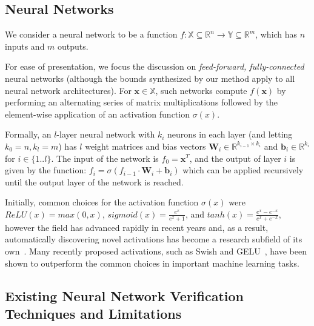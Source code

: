 \subsection{Neural Networks}

We consider a neural network to be a function $ f: \mathbb{X} \subseteq
\mathbb{R}^n \to \mathbb{Y} \subseteq \mathbb{R}^m $, which has $ n $ inputs
and $ m $ outputs.
%

%
For ease of presentation, we focus the discussion
on \textit{feed-forward, fully-connected} neural networks (although
the bounds synthesized by our method apply to all neural
network architectures).
%
For $ \mathbf{x} \in \mathbb{X} $, such networks compute $ f(\mathbf{x}) $ by
performing an alternating
series of matrix multiplications followed by the element-wise
application of an activation function $
\sigma(x) $.


Formally, an $ l $-layer neural network with $ k_i $ neurons in each
layer (and letting $ k_0 = n, k_l = m $) has $ l $ weight matrices
and bias vectors $ \mathbf{W}_i \in \mathbb{R}^{k_{i-1} \times k_i} $
and $ \mathbf{b}_i
\in \mathbb{R}^{k_{i}} $ for $ i \in \{1..l\} $. The input of the network is $
f_0 =
\mathbf{x}^T $, and the output of layer $ i $ is given by the function:
$ f_i = \sigma(f_{i-1} \cdot \mathbf{W}_i + \mathbf{b}_i) $
which can be applied recursively until the output layer of the network is reached.

Initially, common choices for the activation function $ \sigma(x) $ were $ ReLU(x) = max(0, x) $, $
sigmoid(x) = \frac{e^x}{e^x + 1} $, and $ tanh(x) = \frac{e^x - e^{-x}}{e^x +
e^{-x}}  $, however the field has advanced rapidly in recent years and, as a result,
automatically discovering novel activations has become a
research subfield of its own~\cite{ramachandran2017searching}. Many recently proposed activations,
such as Swish and GELU~\cite{ramachandran2017searching,hendrycks2016gaussian},
have been shown to outperform the common choices in important machine learning tasks.


\subsection{Existing Neural Network Verification Techniques and Limitations}

